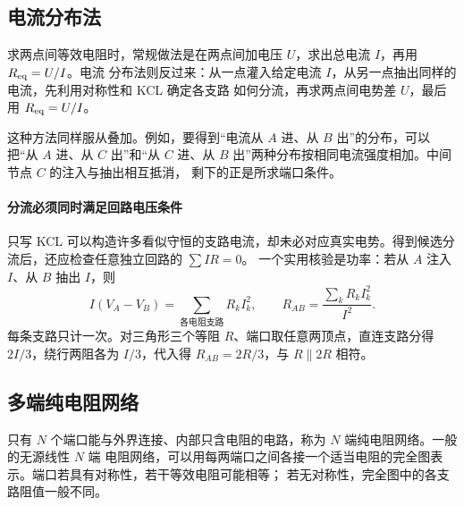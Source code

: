 \subsection*{电流分布法}

求两点间等效电阻时，常规做法是在两点间加电压 $U$，求出总电流 $I$，再用 $R_{\rm eq}=U/I$。电流
分布法则反过来：从一点灌入给定电流 $I$，从另一点抽出同样的电流，先利用对称性和 KCL 确定各支路
如何分流，再求两点间电势差 $U$，最后用 $R_{\rm eq}=U/I$。

这种方法同样服从叠加。例如，要得到“电流从 $A$ 进、从 $B$ 出”的分布，可以把“从 $A$ 进、从
$C$ 出”和“从 $C$ 进、从 $B$ 出”两种分布按相同电流强度相加。中间节点 $C$ 的注入与抽出相互抵消，
剩下的正是所求端口条件。


\paragraph{分流必须同时满足回路电压条件}
只写 KCL 可以构造许多看似守恒的支路电流，却未必对应真实电势。得到候选分流后，还应检查任意独立回路的 $\sum IR=0$。
一个实用核验是功率：若从 $A$ 注入 $I$、从 $B$ 抽出 $I$，则
\[
 I(V_A-V_B)=\sum_{\text{各电阻支路}}R_kI_k^2,
 \qquad R_{AB}=\frac{\sum_kR_kI_k^2}{I^2}.
\]
每条支路只计一次。对三角形三个等阻 $R$、端口取任意两顶点，直连支路分得 $2I/3$，绕行两阻各为 $I/3$，代入得 $R_{AB}=2R/3$，与 $R\parallel2R$ 相符。

\subsection*{多端纯电阻网络}

只有 $N$ 个端口能与外界连接、内部只含电阻的电路，称为 $N$ 端纯电阻网络。一般的无源线性 $N$ 端
电阻网络，可以用每两端口之间各接一个适当电阻的完全图表示。端口若具有对称性，若干等效电阻可能相等；
若无对称性，完全图中的各支路阻值一般不同。

